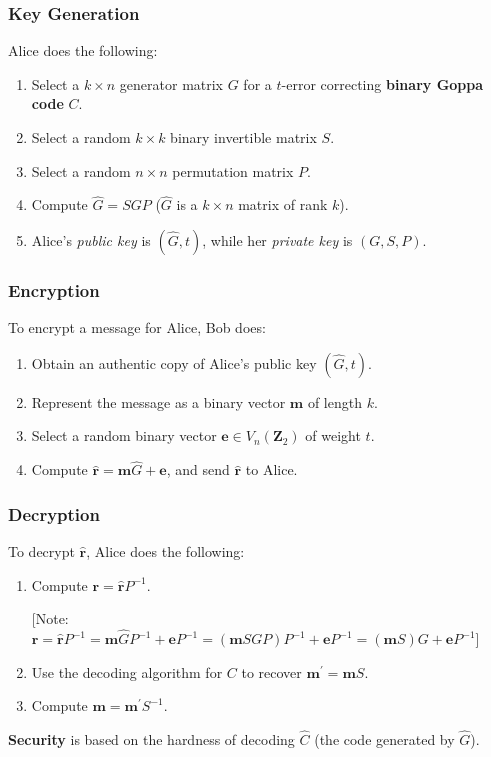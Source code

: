 \subsubsection*{Key Generation}
Alice does the following:
\begin{enumerate}
    \item Select a $ k\times n $ generator matrix $ G $ for a $ t $-error
          correcting \textbf{binary Goppa code} $ C $.
    \item Select a random $ k\times k $ binary invertible matrix $ S $.
    \item Select a random $ n\times n $ permutation matrix $ P $.
    \item Compute $ \hat{G}=SGP $ ($ \hat{G} $ is a $ k\times n $ matrix of rank $ k $).
    \item Alice's \emph{public key} is $ (\hat{G},t) $, while her \emph{private key}
          is $ (G,S,P) $.
\end{enumerate}
\subsubsection*{Encryption}
To encrypt a message for Alice, Bob does:
\begin{enumerate}
    \item Obtain an authentic copy of Alice's public key $ (\hat{G},t) $.
    \item Represent the message as a binary vector $ \symbf{m} $ of length $ k $.
    \item Select a random binary vector $ \symbf{e}\in V_n(\mathbf{Z}_2) $
          of weight $ t $.
    \item Compute $ \hat{\symbf{r}}=\symbf{m}\hat{G}+\symbf{e} $,
          and send $ \hat{\symbf{r}} $ to Alice.
\end{enumerate}
\subsubsection*{Decryption}
To decrypt $ \hat{\symbf{r}} $, Alice does the following:
\begin{enumerate}
    \item Compute $ \symbf{r}=\hat{\symbf{r}}P^{-1} $.

          [Note: $ \symbf{r}=\hat{\symbf{r}}P^{-1}=\symbf{m}\hat{G}P^{-1}+\symbf{e}P^{-1}
              =(\symbf{m}SGP)P^{-1}+\symbf{e}P^{-1}=(\symbf{m}S)G+\symbf{e}P^{-1} $]
    \item Use the decoding algorithm for $ C $ to recover $ \symbf{m}^\prime =\symbf{m}S $.
    \item Compute $ \symbf{m}=\symbf{m}^\prime S^{-1} $.
\end{enumerate}
\textbf{Security} is based on the hardness of decoding $ \hat{C} $
(the code generated by $ \hat{G} $).
